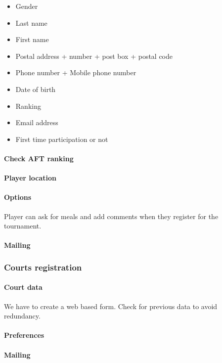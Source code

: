 \begin{itemize}
    \item Gender
    \item Last name
    \item First name
    \item Postal address + number + post box + postal code
    \item Phone number + Mobile phone number
    \item Date of birth
    \item Ranking
    \item Email address
    \item First time participation or not
\end{itemize}

\paragraph{Check AFT ranking}
\paragraph{Player location}
\paragraph{Options}

Player can ask for meals and add comments when they register for the
tournament.

\paragraph{Mailing}

\subsubsection{Courts registration}

\paragraph{Court data}

We have to create a web based form. Check for previous data to avoid
redundancy.

\paragraph{Preferences}
\paragraph{Mailing}

